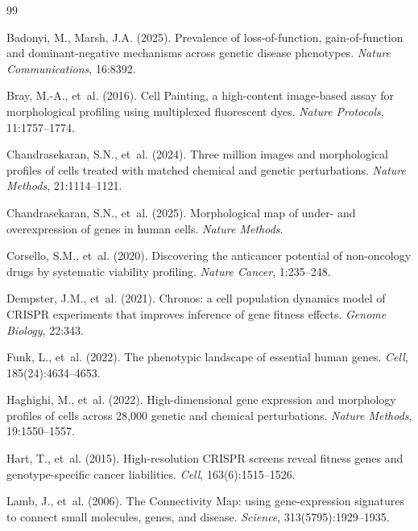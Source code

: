 \documentclass[11pt]{article}
\begin{document}
\begin{thebibliography}{99}

Badonyi, M., Marsh, J.A. (2025).
Prevalence of loss-of-function, gain-of-function and dominant-negative mechanisms across genetic disease phenotypes.
\textit{Nature Communications}, 16:8392.

Bray, M.-A., et~al. (2016).
Cell Painting, a high-content image-based assay for morphological profiling using multiplexed fluorescent dyes.
\textit{Nature Protocols}, 11:1757--1774.

Chandrasekaran, S.N., et~al. (2024).
Three million images and morphological profiles of cells treated with matched chemical and genetic perturbations.
\textit{Nature Methods}, 21:1114--1121.

Chandrasekaran, S.N., et~al. (2025).
Morphological map of under- and overexpression of genes in human cells.
\textit{Nature Methods}.

Corsello, S.M., et~al. (2020).
Discovering the anticancer potential of non-oncology drugs by systematic viability profiling.
\textit{Nature Cancer}, 1:235--248.

Dempster, J.M., et~al. (2021).
Chronos: a cell population dynamics model of CRISPR experiments that improves inference of gene fitness effects.
\textit{Genome Biology}, 22:343.

Funk, L., et~al. (2022).
The phenotypic landscape of essential human genes.
\textit{Cell}, 185(24):4634--4653.

Haghighi, M., et~al. (2022).
High-dimensional gene expression and morphology profiles of cells across 28,000 genetic and chemical perturbations.
\textit{Nature Methods}, 19:1550--1557.

Hart, T., et~al. (2015).
High-resolution CRISPR screens reveal fitness genes and genotype-specific cancer liabilities.
\textit{Cell}, 163(6):1515--1526.

Lamb, J., et~al. (2006).
The Connectivity Map: using gene-expression signatures to connect small molecules, genes, and disease.
\textit{Science}, 313(5795):1929--1935.


\end{thebibliography}
\end{document}
